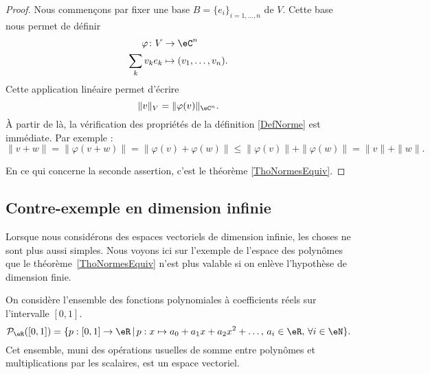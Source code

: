 \begin{proof}
    Nous commençons par fixer une base \( B=\{ e_i \}_{i=1,\ldots, n}\) de \( V\). Cette base nous permet de définir
    \begin{equation}
        \begin{aligned}
            \varphi\colon V&\to \eC^n \\
            \sum_kv_ke_k&\mapsto (v_1,\ldots, v_n).
        \end{aligned}
    \end{equation}
    Cette application linéaire permet d'écrire
    \begin{equation}
        \| v \|_V=\| \varphi(v) \|_{\eC^n}.
    \end{equation}
    À partir de là, la vérification des propriétés de la définition \ref{DefNorme} est immédiate. Par exemple :
    \begin{equation}
        \| v+w \|=\| \varphi(v+w) \|=\| \varphi(v)+\varphi(w) \|\leq \| \varphi(v) \|+\| \varphi(w) \|=\| v \|+\| w \|.
    \end{equation}

    En ce qui concerne la seconde assertion, c'est le théorème \ref{ThoNormesEquiv}.
\end{proof}

\subsection{Contre-exemple en dimension infinie}
\label{SubSecPOlynomesCE}

Lorsque nous considérons des espaces vectoriels de dimension infinie, les choses ne sont plus aussi simples. Nous voyons ici sur l'exemple de l'espace des polynômes que le théorème~\ref{ThoNormesEquiv} n'est plus valable si on enlève l'hypothèse de dimension finie.

On considère l'ensemble des fonctions polynomiales à coefficients réels sur  l'intervalle $[0,1]$.
\begin{equation}
    \mathcal{P}_\eR([0,1])=\{p:[0,1]\to \eR\,|\, p : x\mapsto a_0+a_1 x +a_2 x^2 + \ldots, \, a_i\in\eR,\,\forall i\in \eN\}.
\end{equation}
Cet ensemble, muni des opérations usuelles de somme entre polynômes et multiplications par les scalaires, est un espace vectoriel.

